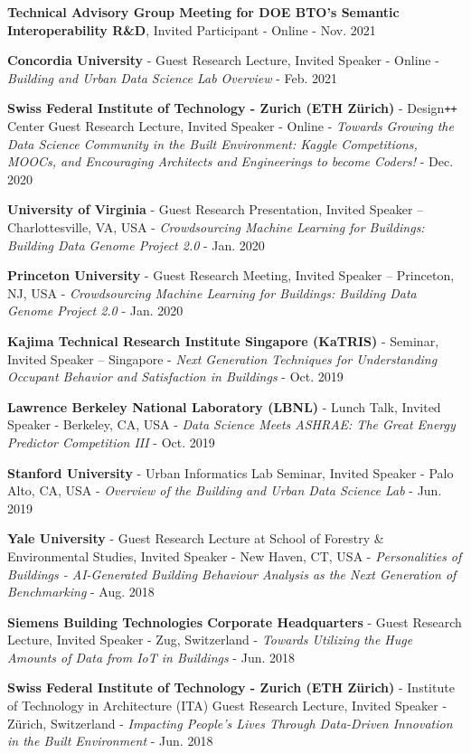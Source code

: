 \documentclass[10pt,a4paper]{article}
\begin{document}
\begin{small}
\begin{etaremune}
\item
\textbf{Technical Advisory Group Meeting for DOE BTO’s Semantic Interoperability R\&D}, Invited Participant - Online - Nov. 2021
\item
\textbf{Concordia University} - Guest Research Lecture, Invited Speaker - Online - \emph{Building and Urban Data Science Lab Overview} - Feb. 2021
\item
\textbf{Swiss Federal Institute of Technology - Zurich (ETH Z{\"u}rich)} - Design\texttt{+}\texttt{+} Center Guest Research Lecture, Invited Speaker - Online - \emph{Towards Growing the Data Science Community in the Built Environment: Kaggle Competitions, MOOCs, and Encouraging Architects and Engineerings to become Coders!} - Dec. 2020 
\item
\textbf{University of Virginia} - Guest Research Presentation, Invited Speaker – Charlottesville, VA, USA - \emph{Crowdsourcing Machine Learning for Buildings: Building Data Genome Project 2.0} - Jan. 2020
\item
\textbf{Princeton University} - Guest Research Meeting, Invited Speaker – Princeton, NJ, USA - \emph{Crowdsourcing Machine Learning for Buildings: Building Data Genome Project 2.0} - Jan. 2020
\item
\textbf{Kajima Technical Research Institute Singapore (KaTRIS)} - Seminar, Invited Speaker – Singapore - \emph{Next Generation Techniques for Understanding Occupant Behavior and Satisfaction in Buildings} - Oct. 2019
\item
\textbf{Lawrence Berkeley National Laboratory (LBNL)} - Lunch Talk, Invited Speaker - Berkeley, CA, USA - \emph{Data Science Meets ASHRAE: The Great Energy Predictor Competition III} - Oct. 2019
\item
\textbf{Stanford University} - Urban Informatics Lab Seminar, Invited Speaker - Palo Alto, CA, USA - \emph{Overview of the Building and Urban Data Science Lab} - Jun. 2019
\item
\textbf{Yale University} - Guest Research Lecture at School of Forestry \& Environmental Studies, Invited Speaker - New Haven, CT, USA - \emph{Personalities of Buildings - AI-Generated Building Behaviour Analysis as the Next Generation of Benchmarking} - Aug. 2018
\item
\textbf{Siemens Building Technologies Corporate Headquarters} - Guest Research Lecture, Invited Speaker - Zug, Switzerland - \emph{Towards Utilizing the Huge Amounts of Data from IoT in Buildings} - Jun. 2018
\item
\textbf{Swiss Federal Institute of Technology - Zurich (ETH Z{\"u}rich)} - Institute of Technology in Architecture (ITA) Guest Research Lecture, Invited Speaker - Z{\"u}rich, Switzerland - \emph{Impacting People’s Lives Through Data-Driven Innovation in the Built Environment} - Jun. 2018

\end{etaremune}
\end{small}
\end{document}
